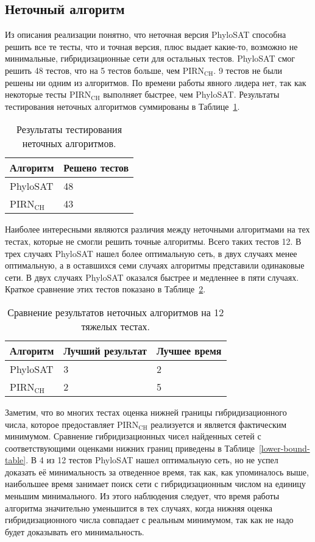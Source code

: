\subsection{Неточный алгоритм}

Из описания реализации понятно, что неточная версия PhyloSAT способна решить все те тесты, что и точная версия, плюс выдает какие-то, возможно не минимальные, гибридизационные сети для остальных тестов.
PhyloSAT смог решить 48 тестов, что на 5 тестов больше, чем PIRN$\mathrm{_{CH}}$.
9 тестов не были решены ни одним из алгоритмов.
По времени работы явного лидера нет, так как некоторые тесты PIRN$\mathrm{_{CH}}$ выполняет быстрее, чем PhyloSAT.
Результаты тестирования неточных алгоритмов суммированы в Таблице~\ref{heuristic-results-table}.

\begin{table}[t]
\caption{Результаты тестирования неточных алгоритмов.}
\centering
\begin{tabular}{l | l}
	Алгоритм & Решено тестов \\
	\hline
	PhyloSAT & 48 \\
	PIRN$\mathrm{_{CH}}$ & 43 \\
\end{tabular}
\label{heuristic-results-table}
\end{table}

Наиболее интересными являются различия между неточными алгоритмами на тех тестах, которые не смогли решить точные алгоритмы.
Всего таких тестов 12.
В трех случаях PhyloSAT нашел более оптимальную сеть, в двух случаях менее оптимальную, а в оставшихся семи случаях алгоритмы представили одинаковые сети.
В двух случаях PhyloSAT оказался быстрее и медленнее в пяти случаях.
Краткое сравнение этих тестов показано в Таблице~\ref{results-comparison-table}.

\begin{table}[t]
\caption{Сравнение результатов неточных алгоритмов на 12 тяжелых тестах.}
\centering
\begin{tabular}{l | l | l}
	Алгоритм & Лучший результат & Лучшее время \\
	\hline
	PhyloSAT & 3 & 2 \\
	PIRN$\mathrm{_{CH}}$ & 2 & 5 \\
\end{tabular}
\label{results-comparison-table}
\end{table}

Заметим, что во многих тестах оценка нижней границы гибридизационного числа, которое предоставляет PIRN$\mathrm{_{CH}}$ реализуется и является фактическим минимумом.
Сравнение гибридизационных чисел найденных сетей с соответствующими оценками нижних границ приведены в Таблице~\ref{lower-bound-table}.
В 4 из 12 тестов PhyloSAT нашел оптимальную сеть, но не успел доказать её минимальность за отведенное время, так как, как упоминалось выше, наибольшее время занимает поиск сети с гибридизационным числом на единицу меньшим минимального.
Из этого наблюдения следует, что время работы алгоритма значительно уменьшится в тех случаях, когда нижняя оценка гибридизационного числа совпадает с реальным минимумом, так как не надо будет доказывать его минимальность.

